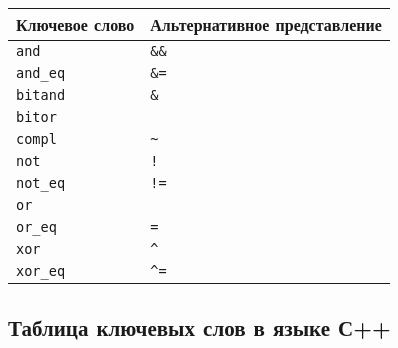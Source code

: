 \begin{longtable}[]{@{}ll@{}}
\toprule\noalign{}
Ключевое слово & Альтернативное представление \\
\midrule\noalign{}
\endhead
\bottomrule\noalign{}
\endlastfoot
\texttt{and} & \texttt{\&\&} \\
\texttt{and\_eq} & \texttt{\&=} \\
\texttt{bitand} & \texttt{\&} \\
\texttt{bitor} & \texttt{\textbar{}} \\
\texttt{compl} & \texttt{\textasciitilde{}} \\
\texttt{not} & \texttt{!} \\
\texttt{not\_eq} & \texttt{!=} \\
\texttt{or} &
\texttt{\textbar{}\textbar{}} \\
\texttt{or\_eq} & \texttt{\textbar{}=} \\
\texttt{xor} & \texttt{\^{}} \\
\texttt{xor\_eq} & \texttt{\^{}=} \\
\end{longtable}

\subsection{\texorpdfstring{Таблица ключевых слов в языке
\textbf{С++}}{Таблица ключевых слов в языке С++}}\label{ux442ux430ux431ux43bux438ux446ux430-ux43aux43bux44eux447ux435ux432ux44bux445-ux441ux43bux43eux432-ux432-ux44fux437ux44bux43aux435-ux441}

